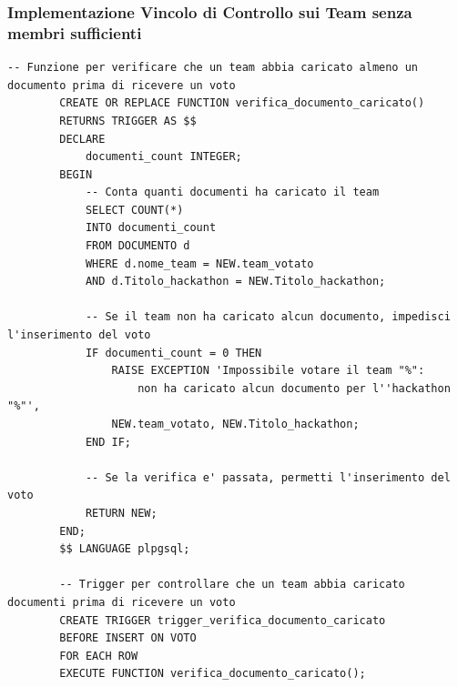 \documentclass[a4paper, 10pt]{article}
\begin{document}
	\subsubsection{Implementazione Vincolo di Controllo sui Team senza membri sufficienti}
	\begin{lstlisting}[style=sqlstyle]
		-- Funzione per verificare che un team abbia caricato almeno un documento prima di ricevere un voto
		CREATE OR REPLACE FUNCTION verifica_documento_caricato()
		RETURNS TRIGGER AS $$
		DECLARE
			documenti_count INTEGER;
		BEGIN
			-- Conta quanti documenti ha caricato il team
			SELECT COUNT(*)
			INTO documenti_count
			FROM DOCUMENTO d
			WHERE d.nome_team = NEW.team_votato
			AND d.Titolo_hackathon = NEW.Titolo_hackathon;
			
			-- Se il team non ha caricato alcun documento, impedisci l'inserimento del voto
			IF documenti_count = 0 THEN
				RAISE EXCEPTION 'Impossibile votare il team "%": 
					non ha caricato alcun documento per l''hackathon "%"',
				NEW.team_votato, NEW.Titolo_hackathon;
			END IF;
			
			-- Se la verifica e' passata, permetti l'inserimento del voto
			RETURN NEW;
		END;
		$$ LANGUAGE plpgsql;
		
		-- Trigger per controllare che un team abbia caricato documenti prima di ricevere un voto
		CREATE TRIGGER trigger_verifica_documento_caricato
		BEFORE INSERT ON VOTO
		FOR EACH ROW
		EXECUTE FUNCTION verifica_documento_caricato();
	\end{lstlisting}
\end{document}

